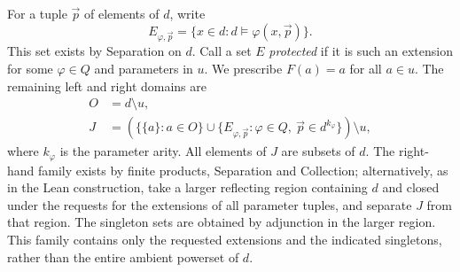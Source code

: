 \documentclass[11pt,a4paper]{article}
\numberwithin{equation}{section}
\theoremstyle{definition}
\theoremstyle{remark}
\begin{document}
For a tuple $\vec p$ of elements of $d$, write
\[E_{\varphi,\vec p}=\{x\in d:d\models\varphi(x,\vec p)\}.\]
This set exists by Separation on $d$. Call a set $E$ \emph{protected} if it is such an extension for some $\varphi\in Q$ and parameters in $u$. We prescribe $F(a)=a$ for all $a\in u$. The remaining left and right domains are
\begin{align*}
 O&=d\setminus u,\\
 J&=\left(\{\{a\}:a\in O\}\cup
      \{E_{\varphi,\vec p}:\varphi\in Q,\ \vec p\in d^{k_\varphi}\}\right)\setminus u,
\end{align*}
where $k_\varphi$ is the parameter arity. All elements of $J$ are subsets of $d$. The right-hand family exists by finite products, Separation and Collection; alternatively, as in the Lean construction, take a larger reflecting region containing $d$ and closed under the requests for the extensions of all parameter tuples, and separate $J$ from that region. The singleton sets are obtained by adjunction in the larger region. This family contains only the requested extensions and the indicated singletons, rather than the entire ambient powerset of $d$.
\end{document}
